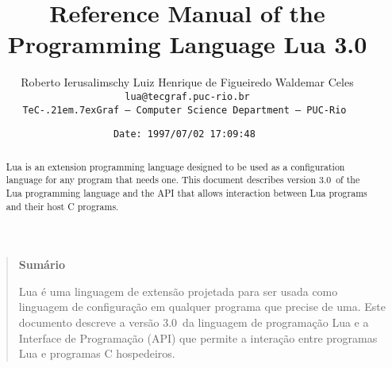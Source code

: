 

\newcommand{\See}[1]{Section~\ref{#1}}
\newcommand{\see}[1]{(see \See{#1})}
\newcommand{\M}[1]{\emph{#1}}
\newcommand{\T}[1]{{\tt #1}}
\newcommand{\Math}[1]{$#1$}
\newcommand{\nil}{{\bf nil}}
\newcommand{\Line}{\rule{\linewidth}{.5mm}}
\def\tecgraf{{\sf TeC\kern-.21em\lower.7ex\hbox{Graf}}}

\newcommand{\Index}[1]{#1\index{#1}}
\newcommand{\IndexVerb}[1]{\T{#1}\index{#1}}
\newcommand{\Def}[1]{\emph{#1}\index{#1}}
\newcommand{\Deffunc}[1]{\index{#1}}

\newcommand{\ff}{$\bullet$\ }

\newcommand{\Version}{3.0}

\makeindex



\title{Reference Manual of the Programming Language Lua \Version}

\author{%
Roberto Ierusalimschy\quad
Luiz Henrique de Figueiredo\quad
Waldemar Celes
\vspace{1.0ex}\\
\smallskip
\small\tt lua@tecgraf.puc-rio.br
\vspace{2.0ex}\\
\tecgraf\ --- Computer Science Department --- PUC-Rio
}

\date{\small \verb$Date: 1997/07/02 17:09:48 $}

\maketitle

\thispagestyle{empty}
\pagestyle{empty}

\begin{abstract}
\noindent
Lua is an extension programming language designed to be used
as a configuration language for any program that needs one.
This document describes version \Version\ of the Lua programming language and
the API that allows interaction between Lua programs and their host C programs.
\end{abstract}

\vspace{4ex}
\begin{quotation}
\small
\begin{center}{\bf Sum\'ario}\end{center}
\vspace{1ex}
\noindent
Lua \'e uma linguagem de extens\~ao projetada para ser usada como
linguagem de configura\c{c}\~ao em qualquer programa que precise de
uma.
Este documento descreve a vers\~ao \Version\ da linguagem de
programa\c{c}\~ao Lua e a Interface de Programa\c{c}\~ao (API) que permite
a intera\c{c}\~ao entre programas Lua e programas C hospedeiros.
\end{quotation}


